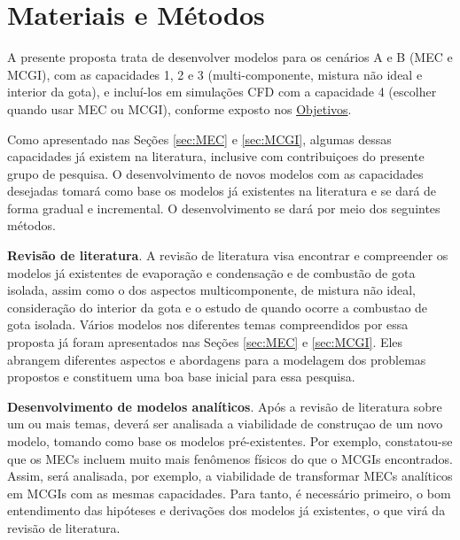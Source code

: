 

\section{Materiais e Métodos} \label{sec:metod}

A presente proposta trata de desenvolver modelos para os cenários A e B (MEC e MCGI), com as capacidades 1, 2 e 3 (multi-componente, mistura não ideal e interior da gota), e incluí-los em simulações CFD com a capacidade 4 (escolher quando usar MEC ou MCGI), conforme exposto nos \hyperref[sec:objetivos]{Objetivos}.

Como apresentado nas Seções \ref{sec:MEC} e \ref{sec:MCGI}, algumas dessas capacidades já existem na literatura, inclusive com contribuiçoes do presente grupo de pesquisa.
O desenvolvimento de novos modelos com as capacidades desejadas tomará como base os modelos já existentes na literatura e se dará de forma gradual e incremental.
O desenvolvimento se dará por meio dos seguintes métodos.

\textbf{Revisão de literatura}. 
A revisão de literatura visa encontrar e compreender os modelos já  existentes de evaporação e condensação e de combustão de gota isolada, assim como o dos aspectos multicomponente, de mistura não ideal, consideração do interior da gota e o estudo de quando ocorre a combustao de gota isolada.
Vários modelos nos diferentes temas compreendidos por essa proposta já foram apresentados nas Seções \ref{sec:MEC} e \ref{sec:MCGI}.
Eles abrangem diferentes aspectos e abordagens para a modelagem dos problemas propostos e constituem uma boa base inicial para essa pesquisa. 

\textbf{Desenvolvimento de modelos analíticos}.
Após a revisão de literatura sobre um ou mais temas, deverá ser analisada a viabilidade de construçao de um novo modelo, tomando como base os modelos pré-existentes.
Por exemplo, constatou-se que os MECs incluem muito mais fenômenos físicos do que o MCGIs encontrados. 
Assim, será analisada, por exemplo, a viabilidade de transformar MECs analíticos em MCGIs com as mesmas capacidades.
Para tanto, é necessário primeiro, o bom entendimento das hipóteses e derivações dos modelos já existentes, o que virá da revisão de literatura.   

